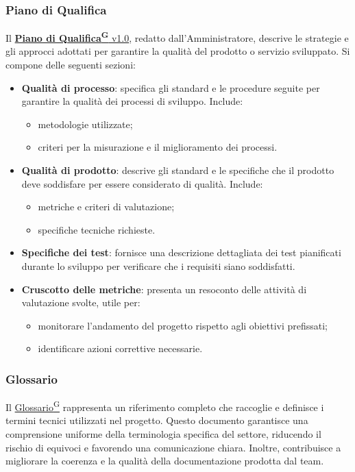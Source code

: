 \subsubsection{Piano di Qualifica}
Il \href{https://code7crusaders.github.io/docs/RTB/documentazione_interna/glossario.html#piano-di-qualifica}{\textbf{Piano di Qualifica\textsuperscript{G}} v1.0}, redatto dall’Amministratore, descrive le strategie e gli approcci adottati per garantire la qualità del prodotto o servizio sviluppato. Si compone delle seguenti sezioni:
\begin{itemize}
    \item \textbf{Qualità di processo}: specifica gli standard e le procedure seguite per garantire la qualità dei processi di sviluppo. Include:
    \begin{itemize}
        \item metodologie utilizzate;
        \item criteri per la misurazione e il miglioramento dei processi.
    \end{itemize}

    \item \textbf{Qualità di prodotto}: descrive gli standard e le specifiche che il prodotto deve soddisfare per essere considerato di qualità. Include:
    \begin{itemize}
        \item metriche e criteri di valutazione;
        \item specifiche tecniche richieste.
    \end{itemize}

    \item \textbf{Specifiche dei test}: fornisce una descrizione dettagliata dei test pianificati durante lo sviluppo per verificare che i requisiti siano soddisfatti.

    \item \textbf{Cruscotto delle metriche}: presenta un resoconto delle attività di valutazione svolte, utile per:
    \begin{itemize}
        \item monitorare l’andamento del progetto rispetto agli obiettivi prefissati;
        \item identificare azioni correttive necessarie.
    \end{itemize}
\end{itemize}
\subsubsection{Glossario}
Il \href{https://code7crusaders.github.io/docs/RTB/documentazione_interna/glossario.html#glossario}{Glossario\textsuperscript{G}} rappresenta un riferimento completo che raccoglie e definisce i termini tecnici utilizzati nel progetto. Questo documento garantisce una comprensione uniforme della terminologia specifica del settore, riducendo il rischio di equivoci e favorendo una comunicazione chiara. Inoltre, contribuisce a migliorare la coerenza e la qualità della documentazione prodotta dal team.

